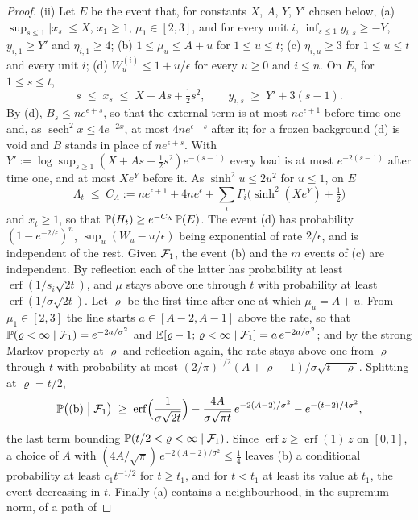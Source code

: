 \begin{proof}
(ii) Let $E$ be the event that, for constants $X$, $A$, $Y$, $Y'$ chosen
below, (a) $\sup_{s\le1}|x_s|\le X$, $x_1\ge1$, $\mu_1\in[2,3]$, and for
every unit $i$, $\inf_{s\le1}y_{i,s}\ge-Y$, $y_{i,1}\ge Y'$ and
$\eta_{i,1}\ge4$; (b) $1\le\mu_u\le A+u$ for $1\le u\le t$; (c)
$\eta_{i,u}\ge3$ for $1\le u\le t$ and every unit $i$; (d)
$W^{(i)}_u\le1+u/\epsilon$ for every $u\ge0$ and $i\le n$. On $E$, for
$1\le s\le t$,
\[
s\;\le\;x_s\;\le\;X+As+\tfrac12s^2,\qquad y_{i,s}\;\ge\;Y'+3(s-1).
\]
By (d), $B_s\le ne^{\epsilon+s}$, so that the external term is at most
$ne^{\epsilon+1}$ before time one and, as
$\operatorname{sech}^2x\le4e^{-2x}$, at most $4ne^{\epsilon-s}$ after it;
for a frozen background (d) is void and $B$ stands in place of
$ne^{\epsilon+s}$. With
$Y':=\log\sup_{s\ge1}(X+As+\tfrac12s^2)e^{-(s-1)}$ every load is at most
$e^{-2(s-1)}$ after time one, and at most $Xe^{Y}$ before it. As
$\sinh^2u\le2u^2$ for $u\le1$, on $E$
\[
\Lambda_t\;\le\;C_\Lambda:=ne^{\epsilon+1}+4ne^{\epsilon}
+\sum_i\Gamma_i\bigl(\sinh^2(Xe^{Y})+\tfrac12\bigr)
\]
and $x_t\ge1$, so that $\mathbb{P}(H_t)\ge e^{-C_\Lambda}\,\mathbb{P}(E)$. The event (d)
has probability $(1-e^{-2/\epsilon})^n$, $\sup_u(W_u-u/\epsilon)$ being
exponential of rate $2/\epsilon$, and is independent of the rest. Given
$\mathcal{F}_1$, the event (b) and the $m$ events of (c) are independent. By
reflection each of the latter has probability at least
$\operatorname{erf}(1/s_i\sqrt{2t})$, and $\mu$ stays above one through
$t$ with probability at least $\operatorname{erf}(1/\sigma\sqrt{2t})$.
Let $\varrho$ be the first time after one at which $\mu_u=A+u$. From
$\mu_1\in[2,3]$ the line starts $a\in[A-2,A-1]$ above the rate, so that
$\mathbb{P}(\varrho<\infty\mid\mathcal{F}_1)=e^{-2a/\sigma^2}$ and
$\mathbb{E}[\varrho-1;\,\varrho<\infty\mid\mathcal{F}_1]=a\,e^{-2a/\sigma^2}$; and by the
strong Markov property at $\varrho$ and reflection again, the rate stays
above one from $\varrho$ through $t$ with probability at most
$(2/\pi)^{1/2}(A+\varrho-1)/\sigma\sqrt{t-\varrho}$. Splitting at
$\varrho=t/2$,
\[
\mathbb{P}\bigl(\text{(b)}\bigm|\mathcal{F}_1\bigr)\;\ge\;
\operatorname{erf}\Bigl(\frac{1}{\sigma\sqrt{2t}}\Bigr)
-\frac{4A}{\sigma\sqrt{\pi t}}\,e^{-2(A-2)/\sigma^2}
-e^{-(t-2)/4\sigma^2},
\]
the last term bounding $\mathbb{P}(t/2<\varrho<\infty\mid\mathcal{F}_1)$. Since
$\operatorname{erf}z\ge\operatorname{erf}(1)\,z$ on $[0,1]$, a choice of
$A$ with $(4A/\sqrt\pi)\,e^{-2(A-2)/\sigma^2}\le\tfrac14$ leaves (b) a
conditional probability at least $c_1t^{-1/2}$ for $t\ge t_1$, and for
$t<t_1$ at least its value at $t_1$, the event decreasing in $t$.
Finally (a) contains a neighbourhood, in the supremum norm, of a path of

\end{proof}
